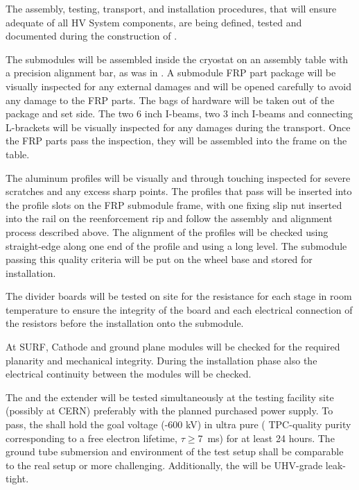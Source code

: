 The assembly, testing, transport, and installation procedures, that will ensure adequate  of all HV System components, are being defined, tested and documented during the construction of .

The  submodules will be assembled inside the cryostat on an assembly table with a precision alignment bar, as was in .  A submodule FRP part package will be visually inspected for any external damages and will be opened carefully to avoid any damage to the FRP parts.  The bags of hardware will be taken out of the package and set side.   The two 6 inch I-beams, two 3 inch I-beams and connecting L-brackets will be visually inspected for any damages during the transport.  Once the FRP parts pass the inspection, they will be assembled into the frame on the table.  

The aluminum profiles will be visually and through touching inspected for severe scratches and any excess sharp points.  The profiles that pass will be inserted into the profile slots on the FRP submodule frame, with one fixing slip nut inserted into the rail on the reenforcement rip and follow the assembly and alignment process described above.  The alignment of the profiles will be checked using straight-edge along one end of the profile and using a long level.  The submodule passing this quality criteria will be put on the wheel base and stored for installation.

The  divider boards will be tested on site for the resistance for each stage in room temperature to ensure the integrity of the board and each electrical connection of the resistors before the installation onto the submodule. 


At SURF, Cathode and ground plane modules will be checked for the required planarity and mechanical integrity. During the installation phase also the electrical continuity between the modules will be checked.

The \fdth and the \hv extender will be tested simultaneously at the testing facility  site (possibly at CERN) preferably with the planned purchased power supply.  To pass, the \fdth shall hold the goal voltage (-600 kV) in ultra pure \lar ( TPC-quality purity corresponding to a free electron lifetime, $\tau\geq$\SI{7}{\ms}) for at least \num{24} hours. The ground tube submersion and \efield environment of the test setup shall be comparable to the real \fc setup or more challenging.  Additionally, the \fdth will be UHV-grade leak-tight.


